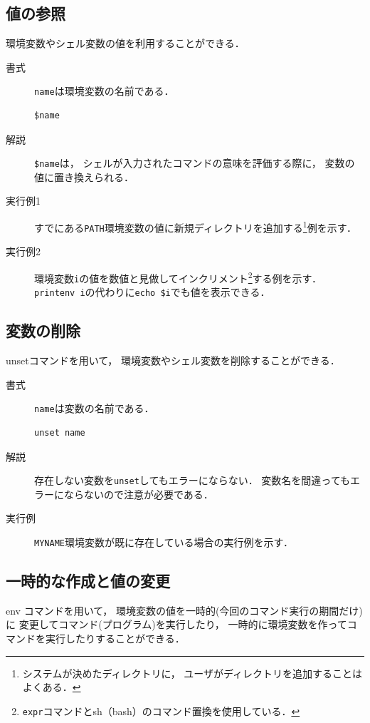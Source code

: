\subsection{値の参照}
環境変数やシェル変数の値を利用することができる．

\begin{description}
\item [書式]
  \texttt{name}は環境変数の名前である．
\begin{lstlisting}[numbers=none]
  $name
\end{lstlisting} %
\item [解説]
  \texttt{\$name}は，
  シェルが入力されたコマンドの意味を評価する際に，
  変数の値に置き換えられる．
\item [実行例1]
  すでにある\texttt{PATH}環境変数の値に新規ディレクトリを追加する\footnote{
    システムが決めたディレクトリに，
    ユーザがディレクトリを追加することはよくある．
  }例を示す．
  
\item [実行例2]
  環境変数\texttt{i}の値を数値と見做してインクリメント\footnote{
    \texttt{expr}コマンドとsh（bash）のコマンド置換を使用している．
  }する例を示す．
  \texttt{printenv i}の代わりに\texttt{echo \$i}でも値を表示できる．
  
\end{description}

\subsection{変数の削除}
unsetコマンドを用いて，
環境変数やシェル変数を削除することができる．

\begin{description}
\item [書式]
  \texttt{name}は変数の名前である．
\begin{lstlisting}[numbers=none]
  unset name
\end{lstlisting}
\item [解説]
  存在しない変数を\texttt{unset}してもエラーにならない．
  変数名を間違ってもエラーにならないので注意が必要である．
\item [実行例]
  \texttt{MYNAME}環境変数が既に存在している場合の実行例を示す．
  
\end{description}

\subsection{一時的な作成と値の変更}
env コマンドを用いて，
環境変数の値を一時的(今回のコマンド実行の期間だけ)に
変更してコマンド(プログラム)を実行したり，
一時的に環境変数を作ってコマンドを実行したりすることができる．


